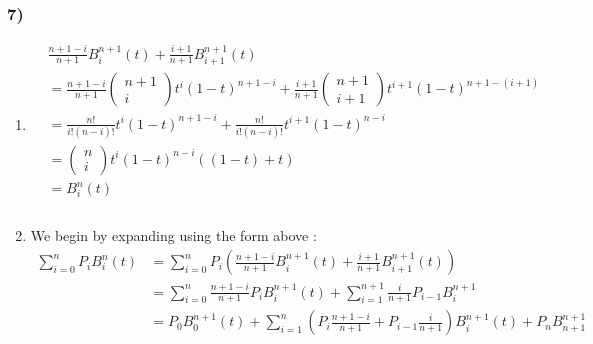 \subsubsection{7)}
\begin{enumerate}
    \item 
        \begin{align*}
            &\frac{ n+1-i }{ n+1 } B _{ i }^{ n+1 } (t) + \frac{ i+1 }{ n+1 }B _{ i+1 }^{
        n+1 } (t)  \\ 
            &=  \frac{ n+1-i }{ n+1 } \begin{pmatrix*}
                n+1  \\
                i  
            \end{pmatrix*}
            t^i\left( 1-t\right) ^{n+1-i} + \frac{ i+1 }{ n+1 } \begin{pmatrix*}
                n+1  \\
                i+1  
            \end{pmatrix*}
            t^{i+1}\left( 1-t\right) ^{n+1-(i+1)} \\ 
            &=  
                \frac{ n! }{ i!\left( n-i\right) ! } 
            t^i\left( 1-t\right) ^{n+1-i} + 
            \frac{n! }{ i!\left( n - i\right)!} 
            t^{i+1}\left( 1-t\right) ^{n-i} \\ 
             &= \begin{pmatrix*}
                 n   \\
                 i  
             \end{pmatrix*}
             t^i\left( 1-t\right) ^{n-i} \left( \left( 1-t\right) + t\right)    
             \\
             &= B _{ i  }^{ n  } (t) \\  
               \\ 
        \end{align*} 
    \item We begin by expanding using the form above : 
        \begin{align*}
            \sum_{i=0}^{n } P_iB _{ i }^{ n  } (t) &= \sum_{i=0}^{n }P_i \left( \frac{ n+1-i
            }{ n+1 }B _{ i }^{ n+1 } (t) + \frac{ i+1 }{ n+1 } B _{ i+1 }^{ n+1 }
        (t)\right) \\
                                                   &= \sum_{i=0}^{n} \frac{ n+1-i }{ n+1 }
                                                   P_iB _{ i }^{ n+1 } (t) +
                                                   \sum_{i=1}^{n+1} \frac{ i }{ n+1 } 
                                                   P_{i-1}B _{ i }^{ n+1 }  \\ 
                                                   &= P_0B _{ 0 }^{ n+1 } (t) +
                                                   \sum_{i=1}^{n} \left( P_i \frac{ n+1-i
                                                   }{ n+1 } + P_{i-1} \frac{ i }{ n+1 }
                                               \right) B _{ i }^{ n+1 } (t) + P_nB _{ n+1
                                           }^{ n+1 }  \\ 
        \end{align*} 
\end{enumerate}


